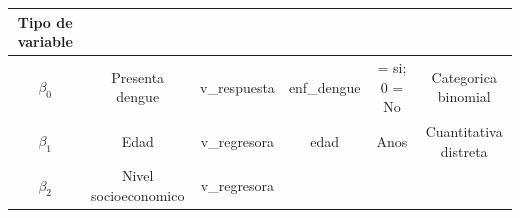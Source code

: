 \documentclass[
]{article}
\begin{document}
\begin{longtable}[]{@{}cccccc@{}}
\begin{minipage}[b]{0.13\columnwidth}
Tipo de variable\strut
\end{minipage}\tabularnewline
\midrule
\endhead
\begin{minipage}[t]{0.07\columnwidth}\centering
\(\beta_0\)\strut
\end{minipage} & \begin{minipage}[t]{0.13\columnwidth}\centering
Presenta dengue\strut
\end{minipage} & \begin{minipage}[t]{0.17\columnwidth}\centering
v\_respuesta\strut
\end{minipage} & \begin{minipage}[t]{0.18\columnwidth}\centering
enf\_dengue\strut
\end{minipage} & \begin{minipage}[t]{0.15\columnwidth}\centering
1 = si; 0 = No\strut
\end{minipage} & \begin{minipage}[t]{0.13\columnwidth}\centering
Categorica binomial\strut
\end{minipage}\tabularnewline
\begin{minipage}[t]{0.07\columnwidth}\centering
\(\beta_1\)\strut
\end{minipage} & \begin{minipage}[t]{0.13\columnwidth}\centering
Edad\strut
\end{minipage} & \begin{minipage}[t]{0.17\columnwidth}\centering
v\_regresora\strut
\end{minipage} & \begin{minipage}[t]{0.18\columnwidth}\centering
edad\strut
\end{minipage} & \begin{minipage}[t]{0.15\columnwidth}\centering
Anos\strut
\end{minipage} & \begin{minipage}[t]{0.13\columnwidth}\centering
Cuantitativa distreta\strut
\end{minipage}\tabularnewline
\begin{minipage}[t]{0.07\columnwidth}\centering
\(\beta_2\)\strut
\end{minipage} & \begin{minipage}[t]{0.13\columnwidth}\centering
Nivel socioeconomico\strut
\end{minipage} & \begin{minipage}[t]{0.17\columnwidth}\centering
v\_regresora\strut
\end{minipage} & \begin{minipage}[t]{0.18\columnwidth}\centering

\end{minipage}
\end{longtable}
\end{document}

